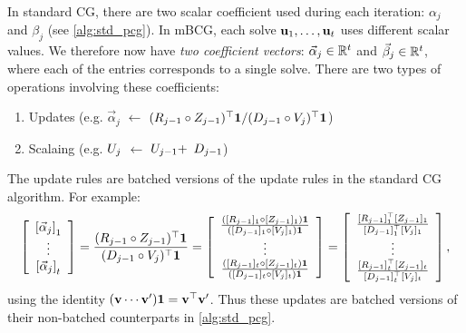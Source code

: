 In standard CG, there are two scalar coefficient used during each iteration: $\alpha_j$ and $\beta_j$ (see \autoref{alg:std_pcg}).
In mBCG, each solve $\mathbf{u}_1, \ldots, \mathbf{u}_t$ uses different scalar values.
We therefore now have \emph{two coefficient vectors}: $\vec \alpha_j \in \mathbb{R}^t$ and $\vec \beta_j \in \mathbb{R}^t$, where each of the entries corresponds to a single solve.
There are two types of operations involving these coefficients:
%
\begin{enumerate}
  \item Updates (e.g. {\color{\colormat} $\vec \alpha_j$ $\gets$ ${( R_{j-1} \circ Z_{j-1} )^\top \mathbf 1}/{( D_{j-1} \circ V_{j} )^\top \mathbf 1}$})
  \item Scalaing (e.g. {\color{\colormat} $U_j$ $\gets$ $U_{j-1} +$  $D_{j-1}$})
\end{enumerate}
%
The update rules are batched versions of the update rules in the standard CG algorithm.
For example:
%
\begin{equation*}
  \left[ \begin{array}{c}
    \left[ \vec \alpha_j \right]_1
    \\
    \vdots
    \\
    \left[ \vec \alpha_j \right]_t
  \end{array} \right]
  = \frac{( R_{j-1} \circ Z_{j-1} )^\top \mathbf 1}{( D_{j-1} \circ V_{j} )^\top \mathbf 1}
  = \left[ \begin{array}{c}
        \frac{\left( [R_{j-1}]_{1} \circ [Z_{j-1}]_{1} \right) \mathbf 1}
        {\left( [D_{j-1}]_{1} \circ [V_{j}]_{1} \right) \mathbf 1}
        \\
        \vdots
        \\
        \frac{\left( [R_{j-1}]_{t} \circ [Z_{j-1}]_{t} \right) \mathbf 1}
        {\left( [D_{j-1}]_{t} \circ [V_{j}]_{t} \right) \mathbf 1}
     \end{array} \right]
  = \left[ \begin{array}{c}
        \frac{[R_{j-1}]_{1}^\top [Z_{j-1}]_{1}}
        {[D_{j-1}]_{1}^\top [V_{j}]_{1}}
        \\
        \vdots
        \\
        \frac{[R_{j-1}]_{t}^\top [Z_{j-1}]_{t}}
        {[D_{j-1}]_{t}^\top [V_{j}]_{t}}
     \end{array} \right],
\end{equation*}
%
using the identity $(\mathbf{v} \cdots \mathbf{v}') \mathbf 1 = \mathbf{v}^\top \mathbf{v}'$.
Thus these updates are batched versions of their non-batched counterparts in \autoref{alg:std_pcg}.
